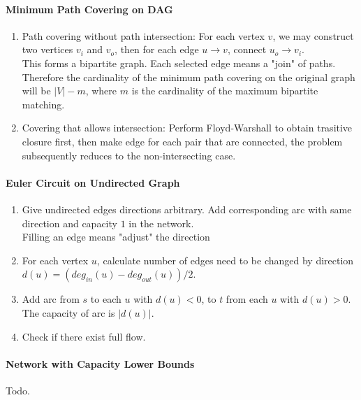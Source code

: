 \paragraph{Minimum Path Covering on DAG}
\begin{enumerate}
\item Path covering without path intersection: For each vertex $v$, we may construct two vertices $v_i$ and $v_o$, then for each edge $u\rightarrow v$, connect $u_o\rightarrow v_i$. \\
This forms a bipartite graph. Each selected edge means a "join" of paths. Therefore the cardinality of the minimum path covering on the original graph will be $|V| - m$, where $m$ is the cardinality of the maximum bipartite matching.
\item Covering that allows intersection: Perform Floyd-Warshall to obtain trasitive closure first, then make edge for each pair that are connected, the problem subsequently reduces to the non-intersecting case.
\end{enumerate}
\paragraph{Euler Circuit on Undirected Graph}
\begin{enumerate}
\item Give undirected edges directions arbitrary. Add corresponding arc with same direction and capacity $1$ in the network. \\
Filling an edge means "adjust" the direction
\item For each vertex $u$, calculate number of edges need to be changed by direction $d(u) = (deg_{in}(u) - deg_{out}(u))/2$.
\item Add arc from $s$ to each $u$ with $d(u)<0$, to $t$ from each $u$ with $d(u)>0$. The capacity of arc is $|d(u)|$.
\item Check if there exist full flow.
\end{enumerate}
\paragraph{Network with Capacity Lower Bounds} Todo.

